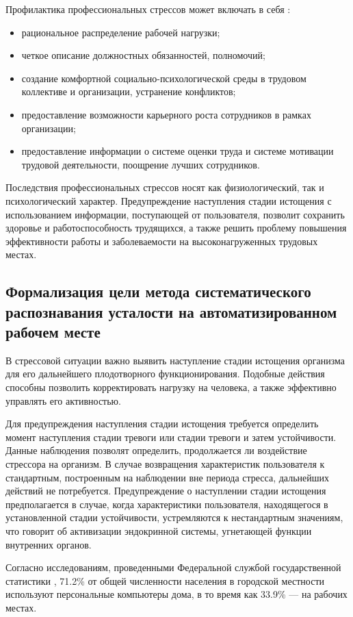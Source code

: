 Профилактика профессиональных стрессов может включать в себя \cite{professionalStress}:
\begin{itemize}[leftmargin=1.6\parindent]
\item рациональное распределение рабочей нагрузки;
\item четкое описание должностных обязанностей, полномочий;
\item создание комфортной социально-психологической среды в трудовом коллективе и организации, устранение конфликтов;
\item предоставление возможности карьерного роста сотрудников в рамках организации;
\item предоставление информации о системе оценки труда и системе мотивации трудовой деятельности, поощрение лучших сотрудников.
\end{itemize}

Последствия профессиональных стрессов носят как физиологический, так и психологический характер. Предупреждение наступления стадии истощения с использованием информации, поступающей от пользователя, позволит сохранить здоровье и работоспособность трудящихся, а также решить проблему повышения эффективности работы и заболеваемости на высоконагруженных трудовых местах.

\subsection{Формализация цели метода систематического распознавания усталости на автоматизированном рабочем месте}
В стрессовой ситуации важно выявить наступление стадии истощения организма для его дальнейшего плодотворного функционирования. Подобные действия способны позволить корректировать нагрузку на человека, а также эффективно управлять его активностью.

Для предупреждения наступления стадии истощения требуется определить момент наступления стадии тревоги или стадии тревоги и затем устойчивости. Данные наблюдения позволят определить, продолжается ли воздействие стрессора на организм. В случае возвращения характеристик пользователя к стандартным, построенным на наблюдении вне периода стресса, дальнейших действий не потребуется. Предупреждение о наступлении стадии истощения предполагается в случае, когда характеристики пользователя, находящегося в установленной стадии устойчивости, устремляются к нестандартным значениям, что говорит об активизации эндокринной системы, угнетающей функции внутренних органов.

Согласно исследованиям, проведенными Федеральной службой государственной статистики \cite{rosstatInvestigation}, 71.2\% от общей численности населения в городской местности используют персональные компьютеры дома, в то время как 33.9\% --- на рабочих местах.

